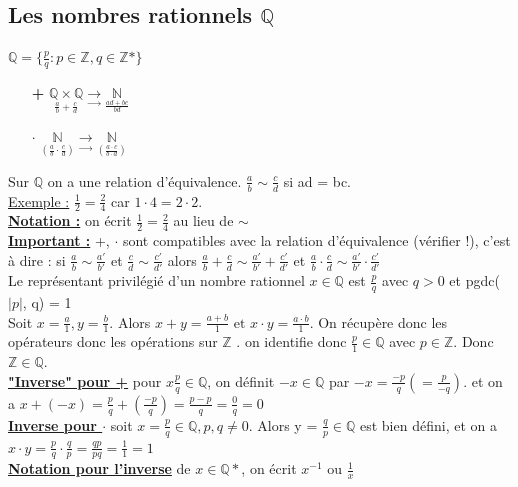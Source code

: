\documentclass[12pt,a4paper]{article}
\newcommand{\evid}[1]{\textbf{\underline{#1}}}
\newcommand{\N}{\ensuremath{\mathbb{N}} }
\newcommand{\Z}{\ensuremath{\mathbb{Z}} }
\newcommand{\Q}{\ensuremath{\mathbb{Q}} }
\newcommand{\et}{\mbox{ et }}
\begin{document}
\subsection{Les nombres rationnels $\mathbb{Q}$}
$\mathbb{Q} = \{\frac{p}{q} : p \in  \Z, q \in \Z*\}$
\begin{itemize}
	\item[\textbf{+}] $\underset{\frac{a}{b} + \frac{c}{d}}{\Q\times\Q} \underset{\to}{\to} \underset{\frac{ad + bc}{bd}}{\N}$	 
	\item[\textbf{$\cdot$}] $\underset{(\frac{a}{b} \cdot \frac{c}{d})}{\N} \underset{\to}{\to} \underset{(\frac{a\cdot c}{b\cdot d})}{\N}$	 
\end{itemize}
Sur $\mathbb{Q}$ on a une relation d'équivalence. $\frac{a}{b} \sim \frac{c}{d}$ si ad = bc.\\
\underline{Exemple :} $\frac{1}{2} = \frac{2}{4}$ car $1 \cdot 4  = 2 \cdot 2$.\\
\evid{Notation :} on écrit $\frac{1}{2} = \frac{2}{4}$ au lieu de $\sim$\\
\evid{Important :} +, $\cdot$ sont compatibles avec la relation d'équivalence (vérifier !), c'est à dire : si $\frac{a}{b} \sim \frac{a'}{b'}$ et $\frac{c}{d} \sim \frac{c'}{d'}$ alors $\frac{a}{b} + \frac{c}{d} \sim \frac{a'}{b'} + \frac{c'}{d'}$ et $\frac{a}{b} \cdot \frac{c}{d} \sim \frac{a'}{b'} \cdot \frac{c'}{d'}$\\
Le représentant privilégié d'un nombre rationnel $x \in \mathbb{Q}$ est $\frac{p}{q}$ avec $q > 0$ et pgdc($|p|$, q) = 1\\
Soit $x = \frac{a}{1}, y =  \frac{b}{1}.$ Alors $x+y = \frac{a+b}{1} \et x\cdot y = \frac{a\cdot b}{1}.$ On récupère donc les opérateurs donc les opérations sur \Z. on identifie donc $\frac{p}{1} \in \Q$ avec $p \in \Z$. Donc $\Z \in \Q$.\\
\evid{"Inverse" pour +} pour $x\frac{p}{q} \in  \Q$, on définit $-x \in \Q$ par $-x = \frac{-p}{q} (= \frac{p}{-q})$. et on a $x + (-x) = \frac{p}{q} + (\frac{-p}{q}) = \frac{p-p}{q} = \frac{0}{q} = 0$\\
\evid{Inverse pour $\cdot$} soit $x = \frac{p}{q} \in \Q, p, q \neq 0$. Alors y = $\frac{q}{p} \in \Q$ est bien défini, et on a $x \cdot y = \frac{p}{q} \cdot \frac{q}{p} = \frac{qp}{pq} = \frac{1}{1} = 1$\\
\evid{Notation pour l'inverse} de $x \in \Q*$, on écrit $x^{-1}$ ou $\frac{1}{x}$
\end{document}
